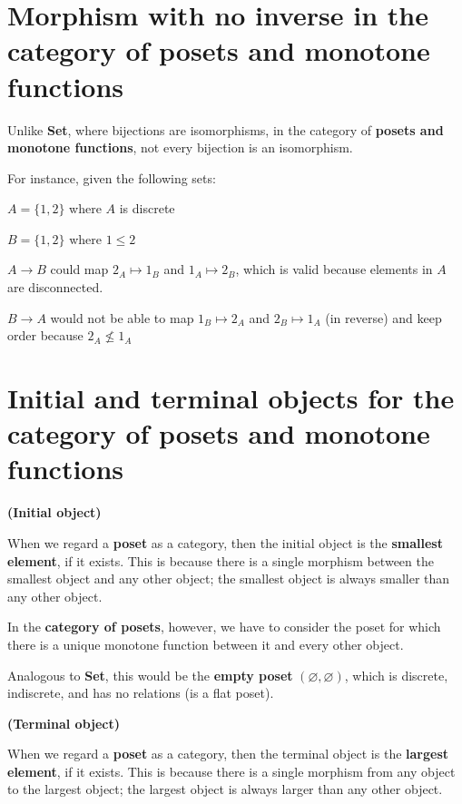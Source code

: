 \documentclass[../main.tex]{subfiles}
\begin{document}
\section{Morphism with no inverse in the category of posets and monotone functions}

Unlike \textbf{Set}, where bijections are isomorphisms, in the category of \textbf{posets and monotone functions}, not every bijection is an isomorphism.

For instance, given the following sets:\par
$A = \{1,2\}$ where $A$ is discrete \par
$B = \{1,2\}$ where $1 \leq 2$ \par
$A \rightarrow B$ could map $2_A \mapsto 1_B$ and $1_A \mapsto 2_B$, which is valid because elements in $A$ are disconnected. \par
$B \rightarrow A$ would not be able to map $1_B \mapsto 2_A$ and $2_B \mapsto 1_A$ (in reverse) and keep order because $2_A \nleq 1_A$

\section{Initial and terminal objects for the category of posets and monotone functions}

\textbf{(Initial object)} \par

When we regard a \textbf{poset} as a category, then the initial object is the \textbf{smallest element}, if it exists. This is because there is a single morphism between the smallest object and any other object; the smallest object is always smaller than any other object.

In the \textbf{category of posets}, however, we have to consider the poset for which there is a unique monotone function between it and every other object.\par

Analogous to \textbf{Set}, this would be the \textbf{empty poset} $(\varnothing , \varnothing)$, which is discrete, indiscrete, and has no relations (is a flat poset). \par

\textbf{(Terminal object)} \par

When we regard a \textbf{poset} as a category, then the terminal object is the \textbf{largest element}, if it exists. This is because there is a single morphism from any object to the largest object; the largest object is always larger than any other object.
\end{document}
